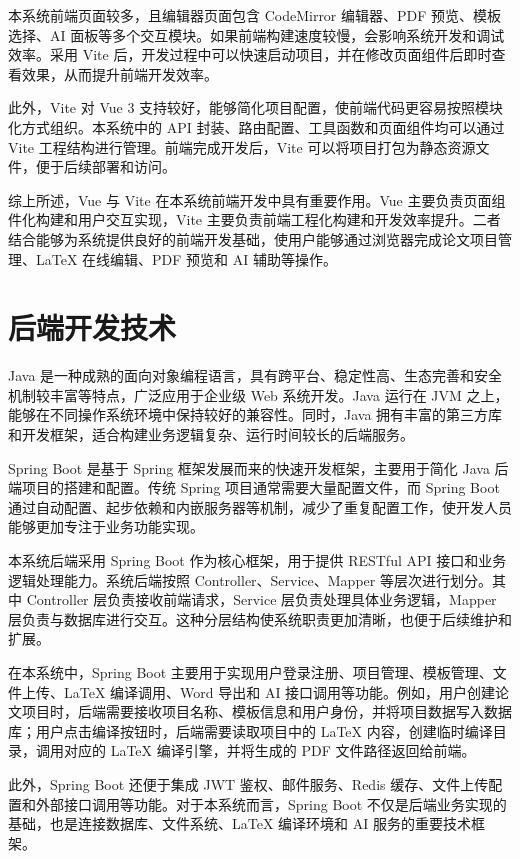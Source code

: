 \documentclass{xduugthesis}
\begin{document}
本系统前端页面较多，且编辑器页面包含 CodeMirror 编辑器、PDF 预览、模板选择、AI 面板等多个交互模块。如果前端构建速度较慢，会影响系统开发和调试效率。采用 Vite 后，开发过程中可以快速启动项目，并在修改页面组件后即时查看效果，从而提升前端开发效率。

此外，Vite 对 Vue 3 支持较好，能够简化项目配置，使前端代码更容易按照模块化方式组织。本系统中的 API 封装、路由配置、工具函数和页面组件均可以通过 Vite 工程结构进行管理。前端完成开发后，Vite 可以将项目打包为静态资源文件，便于后续部署和访问。

综上所述，Vue 与 Vite 在本系统前端开发中具有重要作用。Vue 主要负责页面组件化构建和用户交互实现，Vite 主要负责前端工程化构建和开发效率提升。二者结合能够为系统提供良好的前端开发基础，使用户能够通过浏览器完成论文项目管理、LaTeX 在线编辑、PDF 预览和 AI 辅助等操作。

\section{后端开发技术}
Java 是一种成熟的面向对象编程语言，具有跨平台、稳定性高、生态完善和安全机制较丰富等特点，广泛应用于企业级 Web 系统开发。Java 运行在 JVM 之上，能够在不同操作系统环境中保持较好的兼容性。同时，Java 拥有丰富的第三方库和开发框架，适合构建业务逻辑复杂、运行时间较长的后端服务。

Spring Boot 是基于 Spring 框架发展而来的快速开发框架，主要用于简化 Java 后端项目的搭建和配置\cite{walls2016spring}。传统 Spring 项目通常需要大量配置文件，而 Spring Boot 通过自动配置、起步依赖和内嵌服务器等机制，减少了重复配置工作，使开发人员能够更加专注于业务功能实现。

本系统后端采用 Spring Boot 作为核心框架，用于提供 RESTful API 接口和业务逻辑处理能力。系统后端按照 Controller、Service、Mapper 等层次进行划分。其中 Controller 层负责接收前端请求，Service 层负责处理具体业务逻辑，Mapper 层负责与数据库进行交互。这种分层结构使系统职责更加清晰，也便于后续维护和扩展。

在本系统中，Spring Boot 主要用于实现用户登录注册、项目管理、模板管理、文件上传、LaTeX 编译调用、Word 导出和 AI 接口调用等功能。例如，用户创建论文项目时，后端需要接收项目名称、模板信息和用户身份，并将项目数据写入数据库；用户点击编译按钮时，后端需要读取项目中的 LaTeX 内容，创建临时编译目录，调用对应的 LaTeX 编译引擎，并将生成的 PDF 文件路径返回给前端。

此外，Spring Boot 还便于集成 JWT 鉴权、邮件服务、Redis 缓存、文件上传配置和外部接口调用等功能。对于本系统而言，Spring Boot 不仅是后端业务实现的基础，也是连接数据库、文件系统、LaTeX 编译环境和 AI 服务的重要技术框架。
\end{document}
